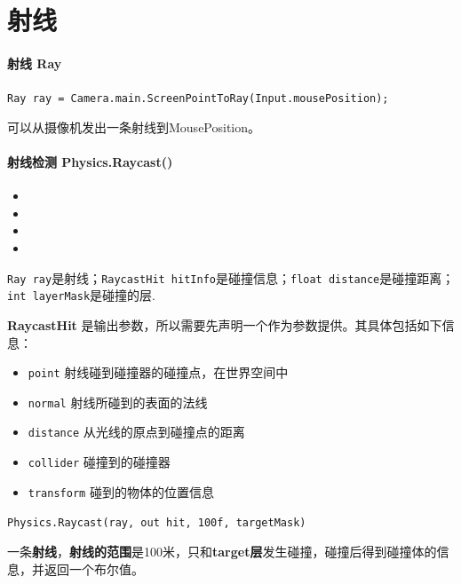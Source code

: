 \documentclass[UTF8,a4paper,12pt]{ctexbook}
\begin{document}
	\section{射线}
		\paragraph{射线 Ray}
			\verb|Ray ray = Camera.main.ScreenPointToRay(Input.mousePosition);|
			
			可以从摄像机发出一条射线到MousePosition。
			
			
		\paragraph{射线检测 Physics.Raycast()}
			\begin{itemize}[itemindent = 1em]
				\item {}
				\item {}
				\item {}
				\item {}
			\end{itemize}
			
			\verb|Ray ray|是射线；\verb|RaycastHit hitInfo|是碰撞信息；\verb|float distance|是碰撞距离；\verb|int layerMask|是碰撞的层.
			
			\textbf{RaycastHit} 是输出参数，所以需要先声明一个作为参数提供。其具体包括如下信息：
			\begin{itemize}[itemindent = 1em]
				\item \verb|point| 射线碰到碰撞器的碰撞点，在世界空间中
				\item \verb|normal| 射线所碰到的表面的法线
				\item \verb|distance| 从光线的原点到碰撞点的距离
				\item \verb|collider| 碰撞到的碰撞器
				\item \verb|transform| 碰到的物体的位置信息
			\end{itemize}
			
			\verb|Physics.Raycast(ray, out hit, 100f, targetMask)|
			
			一条\textbf{射线}，\textbf{射线的范围}是100米，只和\textbf{target层}发生碰撞，碰撞后得到碰撞体的信息，并返回一个布尔值。
	
\end{document}
